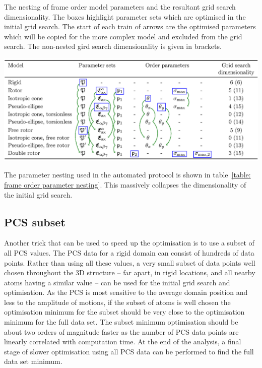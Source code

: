 \begin{table}
\begin{center}
\caption[Frame order parameter nesting.]{The nesting of frame order model parameters and the resultant grid search dimensionality.  The boxes highlight parameter sets which are optimised in the initial grid search.  The start of each train of arrows are the optimised parameters which will be copied for the more complex model and excluded from the grid search.  The non-nested gird search dimensionality is given in brackets.}
\includegraphics[width=\textwidth]{frame_order/parameter_nesting.ps}
\label{table: frame order parameter nesting}
\end{center}
\end{table}

The parameter nesting used in the automated protocol is shown in table~\ref{table: frame order parameter nesting}.
This massively collapses the dimensionality of the initial grid search.





\subsection{PCS subset}

Another trick that can be used to speed up the optimisation is to use a subset of all PCS values.
The PCS data for a rigid domain can consist of hundreds of data points.
Rather than using all these values, a very small subset of data points well chosen throughout the 3D structure -- far apart, in rigid locations, and all nearby atoms having a similar value -- can be used for the initial grid search and optimisation.
As the PCS is most sensitive to the average domain position and less to the amplitude of motions, if the subset of atoms is well chosen the optimisation minimum for the subset should be very close to the optimisation minimum for the full data set.
The subset minimum optimisation should be about two orders of magnitude faster as the number of PCS data points are linearly correlated with computation time.
At the end of the analysis, a final stage of slower optimisation using all PCS data can be performed to find the full data set minimum.

